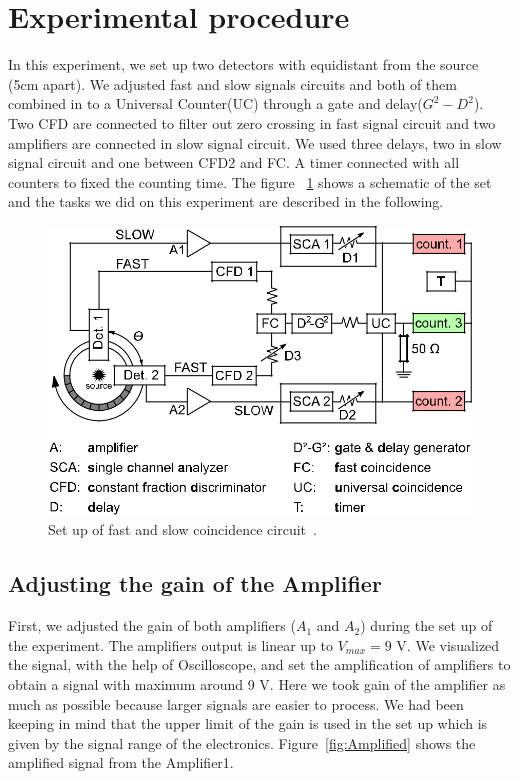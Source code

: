 \section{Experimental procedure}
In this experiment, we set up two detectors with equidistant from the source (5cm apart). We adjusted fast and slow signals circuits and both of them combined in to a Universal Counter(UC) through a gate and delay($G^{2}-D^{2}$). Two CFD are connected to filter out zero crossing in fast signal circuit and two amplifiers are connected in slow signal circuit. We used three delays, two in slow signal circuit and one between CFD2 and FC. A timer connected with all counters to fixed the counting time. The figure ~\ref{fig:CCuit} shows a schematic of the set and the tasks we did on this experiment are described in the following.

\begin{figure}[ht]
	\centering
	\includegraphics[width=0.7\linewidth]{./figs/CirCuit.png}
	\caption{Set up of fast and slow coincidence circuit~\cite{descr}.}%
	\label{fig:CCuit}
\end{figure}
\subsection{Adjusting the gain of the Amplifier}
First, we adjusted the gain of both amplifiers  ($A_{1}$ and  $A_{2}$) during the set up of the experiment. The amplifiers output is linear up to $V_{max}=9$ V. We visualized the signal, with the help of Oscilloscope, and set the amplification of amplifiers  to obtain a signal with maximum around 9 V. Here we took gain of the amplifier as much as possible because larger signals are easier to process. We had been keeping in mind that the upper limit of the gain is used in the set up which is given by the signal range of the electronics. Figure~\ref{fig:Amplified} shows the amplified signal from the Amplifier1.

